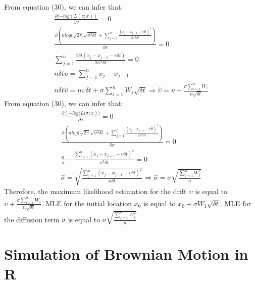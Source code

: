 \documentclass[twoside,11pt]{article}
\begin{document}
From equation (30), we can infer that:
\begin{align}
    \frac{\partial({-log(L({\upsilon;x}))}}{\partial{\upsilon}} =0 \\
    \frac{\partial({nlog(\sqrt{2\pi}\sqrt{\sigma^{2}\delta t}+\sum_{j=1}^{n}\frac{(x_{j}-x_{j-1}-\upsilon\delta t)^{2}}{2\sigma^{2}\delta t}})}{\partial{\upsilon}} =0\\
    \sum_{j=1}^{n}\frac{2\delta t(x_{j}-x_{j-1}-\upsilon\delta t )}{2\sigma^{2}\delta t} =0\\
    n\delta t \upsilon = \sum_{j=1}^{n}x_{j}-x_{j-1}\\
    n\delta t \hat{\upsilon} = n\upsilon\delta t+\sigma \sum_{i=1}^{n}W_{i}\sqrt{\delta t}
    \Longrightarrow \hat{\upsilon} = \upsilon +\frac{\sigma \sum_{i=1}^{n}W_{i}}{n\sqrt{\delta t}}
\end{align}
From equation (30), we can infer that:
\begin{align}
    \frac{\partial({-log(L({\sigma};x}))}{\partial{\sigma}} =0 \\
    \frac{\partial({nlog(\sqrt{2\pi}\sqrt{\sigma^{2}\delta t}+\sum_{j=1}^{n}\frac{(x_{j}-x_{j-1}-\upsilon\delta t)^{2}}{2\sigma^{2}\delta t}})}{\partial{\sigma}} =0\\
    \frac{n}{\sigma} -\frac{\sum_{j=1}^{n}(x_{j}-x_{j-1}-\upsilon\delta t)^{2}}{\sigma^{3}\delta t} =0\\
    \hat{\sigma} = \sqrt{\frac{\sum_{j=1}^{n}(x_{j}-x_{j-1}-\upsilon\delta t)^{2}}{n\delta t}}
    \Longrightarrow \hat{\sigma} =\sigma \sqrt{\frac{\sum_{j=1}^{n}W_{j}^{2}}{n}}
\end{align}
Therefore, the maximum likelihood estimation for the drift $\upsilon$ is equal to $\upsilon +\frac{\sigma \sum_{i=1}^{n}W_{i}}{n\sqrt{\delta t}}$. MLE for the initial location $x_{0}$ is equal to $ x_{0} + \sigma W_{1}\sqrt{\delta t}$. MLE for the diffusion term $\sigma$ is equal to $\sigma \sqrt{\frac{\sum_{j=1}^{n}W_{j}^{2}}{n}}$

\section{Simulation of Brownian Motion in R}
\end{document}
